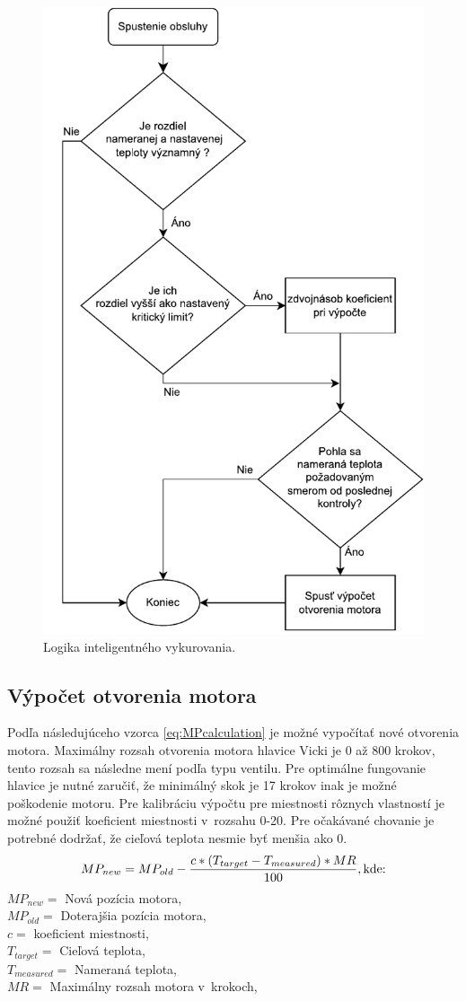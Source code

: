 \begin{figure}[H]
    \centering
    \includegraphics[width=0.65\columnwidth]{obrazky-figures/Algo (4).pdf}
    \caption{Logika inteligentného vykurovania.}
    \label{fig:ProportionalAlgLogic}
\end{figure}
\subsection*{Výpočet otvorenia motora}
Podľa následujúceho vzorca \ref{eq:MPcalculation} je možné vypočítať nové otvorenia motora. 
Maximálny rozsah otvorenia motora hlavice Vicki je 0 až 800 krokov, tento rozsah sa následne mení podľa typu ventilu. 
Pre optimálne fungovanie hlavice je nutné zaručiť, že minimálný skok je 17 krokov inak je možné poškodenie motoru. 
Pre kalibráciu výpočtu pre miestnosti rôznych vlastností je možné použiť koeficient miestnosti v~rozsahu 0-20. 
Pre očakávané chovanie je potrebné dodržať, že cieľová teplota nesmie byť menšia ako 0.
\begin{equation}
    \centering
    \label{eq:MPcalculation}
    MP_{new} = MP_{old} - \frac{c * (T_{target} - T_{measured})*{MR}}{100}, \text{kde:}
 \end{equation}
 $MP_{new} =$ Nová pozícia motora,\\
$MP_{old} =$ Doterajšia pozícia motora,\\
$c = $ koeficient miestnosti,\\
$T_{target} = $ Cieľová teplota,\\
$T_{measured} = $ Nameraná teplota,\\
$MR = $ Maximálny rozsah motora v~krokoch,\\
